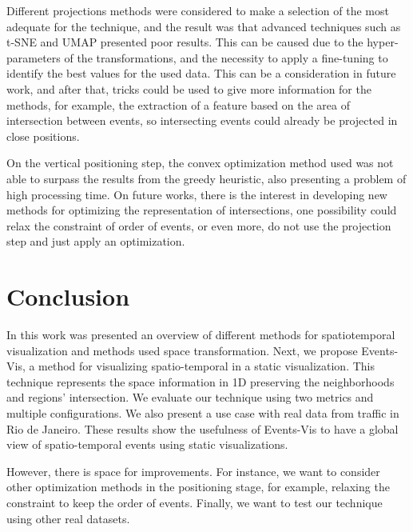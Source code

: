 Different projections methods were considered to make a selection of the most adequate for the technique, and the result was that advanced techniques such as t-SNE and UMAP presented poor results.
%
This can be caused due to the hyper-parameters of the transformations, and the necessity to apply a fine-tuning to identify the best values for the used data.
%
This can be a consideration in future work, and after that, tricks could be used to give more information for the methods, for example, the extraction of a feature based on the area of intersection between events, so intersecting events could already be projected in close positions.  

On the vertical positioning step, the convex optimization method used was not able to surpass the results from the greedy heuristic, also presenting a problem of high processing time.
%
On future works, there is the interest in developing new methods for optimizing the representation of intersections, one possibility could relax the constraint of order of events, or even more, do not use the projection step and just apply an optimization.


\newpage 
\chapter{Conclusion}

In this work was presented an overview of different methods for spatiotemporal visualization and methods used space transformation.
%
Next, we propose Events-Vis, a method for visualizing spatio-temporal in a static visualization. 
%
This technique represents the space information in 1D preserving the neighborhoods and regions' intersection. 
%
We evaluate our technique using two metrics and multiple configurations. 
%
We also present a use case with real data from traffic in Rio de Janeiro. 
%
These results show the usefulness of Events-Vis to have a global view of spatio-temporal events using static visualizations. 


However, there is space for improvements. 
%
For instance, we want to consider other optimization methods in the positioning stage, for example, relaxing the constraint to keep the order of events.
%
Finally, we want to test our technique using other real datasets.
